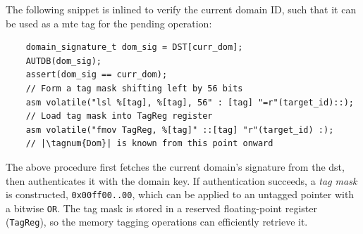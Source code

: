 The following snippet is inlined to verify the current domain ID, such that it can be used as a \gls{mte} tag for the pending operation:
\begin{verbatim}
    domain_signature_t dom_sig = DST[curr_dom];
    AUTDB(dom_sig);
    assert(dom_sig == curr_dom);
    // Form a tag mask shifting left by 56 bits
    asm volatile("lsl %[tag], %[tag], 56" : [tag] "=r"(target_id)::); 
    // Load tag mask into TagReg register
    asm volatile("fmov TagReg, %[tag]" ::[tag] "r"(target_id) :);  
    // |\tagnum{Dom}| is known from this point onward
\end{verbatim}
The above procedure first fetches the current domain's signature from the \gls{dst}, then authenticates it with the domain key.
If authentication succeeds, a \emph{tag mask} is constructed, \eg \texttt{0x00ff00..00}, which can be applied to an untagged pointer with a bitwise \texttt{OR}.
The tag mask is stored in a reserved floating-point register (\texttt{TagReg}), so the memory tagging operations can efficiently retrieve it.







